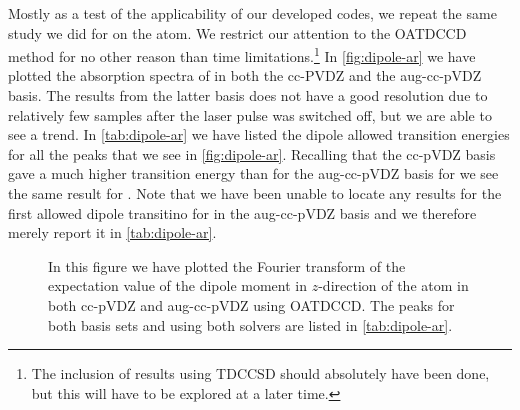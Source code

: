         Mostly as a test of the applicability of our developed codes, we repeat
        the same study we did for  on the  atom.
        We restrict our attention to the OATDCCD method for no other reason than
        time limitations.\footnote{%
            The inclusion of results using TDCCSD should absolutely have been
            done, but this will have to be explored at a later time.
        }
        In \autoref{fig:dipole-ar} we have plotted the absorption spectra of
         in both the cc-PVDZ and the aug-cc-pVDZ basis.
        The results from the latter basis does not have a good resolution due to
        relatively few samples after the laser pulse was switched off, but we
        are able to see a trend.
        In \autoref{tab:dipole-ar} we have listed the dipole allowed transition
        energies for all the peaks that we see in \autoref{fig:dipole-ar}.
        Recalling that the cc-pVDZ basis gave a much higher transition energy
        than for the aug-cc-pVDZ basis for  we see the same result for
        .
        Note that we have been unable to locate any results for the first
        allowed dipole transitino for  in the aug-cc-pVDZ basis and we
        therefore merely report it in \autoref{tab:dipole-ar}.
        \begin{figure}
            \centering
            \caption{In this figure we have plotted the Fourier transform of the
            expectation value of the dipole moment in $z$-direction of the
             atom in both cc-pVDZ and aug-cc-pVDZ using OATDCCD.
            The peaks for both basis sets and using both solvers are listed in
            \autoref{tab:dipole-ar}.}
            \label{fig:dipole-ar}
        \end{figure}

